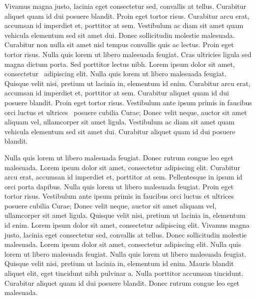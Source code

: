 \documentclass{article}
\begin{document}
\beginnumbering
\autopar
Vivamus magna justo, lacinia eget consectetur sed, convallis at tellus. Curabitur aliquet quam id dui posuere blandit. Proin eget tortor risus. Curabitur arcu erat, accumsan id imperdiet et, porttitor at sem. Vestibulum ac diam sit amet quam vehicula elementum sed sit amet dui. Donec sollicitudin molestie malesuada. Curabitur non nulla sit amet nisl tempus convallis quis ac lectus. Proin eget tortor risus. Nulla quis lorem ut libero malesuada feugiat. Cras ultricies ligula sed magna dictum porta. Sed porttitor lectus nibh. Lorem ipsum dolor sit amet, consectetur \hidenumberingonrightpage\ adipiscing elit. Nulla quis lorem ut libero malesuada feugiat. Quisque velit nisi, pretium ut lacinia in, elementum id enim. Curabitur arcu erat, accumsan id imperdiet et, porttitor at sem. Curabitur aliquet quam id dui posuere blandit. Proin eget tortor risus. Vestibulum ante ipsum primis in faucibus orci luctus et ultrices \hidenumberingonleftpage\ posuere cubilia Curae; Donec velit neque, auctor sit amet aliquam vel, ullamcorper sit amet ligula. Vestibulum ac diam sit amet quam vehicula elementum sed sit amet dui. Curabitur aliquet quam id dui posuere blandit.

Nulla quis lorem ut libero malesuada feugiat. Donec rutrum congue leo eget malesuada. Lorem ipsum dolor sit amet, consectetur adipiscing elit. Curabitur arcu erat, accumsan id imperdiet et, porttitor at sem. Pellentesque in ipsum id orci porta dapibus. Nulla quis lorem ut libero malesuada feugiat. Proin eget tortor risus. Vestibulum ante ipsum primis in faucibus orci luctus et ultrices posuere cubilia Curae; Donec velit neque, auctor sit amet aliquam vel, ullamcorper sit amet ligula. Quisque velit nisi, pretium ut lacinia in, elementum id enim. Lorem ipsum dolor sit amet, consectetur adipiscing elit. Vivamus magna justo, lacinia eget consectetur sed, convallis at tellus. Donec sollicitudin molestie malesuada. Lorem ipsum dolor sit amet, consectetur adipiscing elit. Nulla quis lorem ut libero malesuada feugiat. Nulla quis lorem ut libero malesuada feugiat. Quisque velit nisi, pretium ut lacinia in, elementum id enim. Mauris blandit aliquet elit, eget tincidunt nibh pulvinar a. Nulla porttitor accumsan tincidunt. Curabitur aliquet quam id dui posuere blandit. Donec rutrum congue leo eget malesuada.
\end{document}

